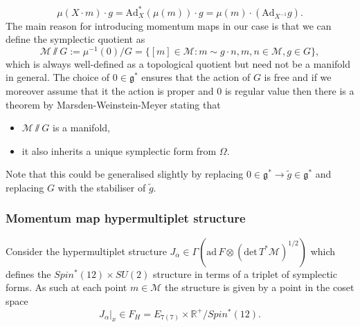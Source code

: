 \begin{equation}
    \mu(X\cdot m)\cdot g = \text{Ad}_{X}^*(\mu(m))\cdot g = \mu(m)\cdot(\text{Ad}_{X^{-1}}g). 
\end{equation}
The main reason for introducing momentum maps in our case is that we can define the symplectic quotient as 
\begin{equation}
    \mathcal{M}\sslash G := \mu^{-1}(0)/G = \{[m]\in \mathcal{M} : m\sim g\cdot n, m,n\in \mathcal{M}, g\in G\},
\end{equation}
which is always well-defined as a topological quotient but need not be a manifold in general. The choice of $0\in\mathfrak{g}^*$ ensures that the action of $G$ is free and if we moreover assume that it the action is proper and $0$ is regular value then there is a theorem by Marsden-Weinstein-Meyer stating that 
\begin{itemize}
    \item $\mathcal{M}\sslash G$ is a manifold,
    \item it also inherits a unique symplectic form from $\Omega$. 
\end{itemize}
Note that this could be generalised slightly by replacing $0\in\mathfrak{g}^*\to \tilde{g}\in\mathfrak{g}^*$ and replacing $G$ with the stabiliser of $\tilde{g}$.  

\subsubsection{Momentum map hypermultiplet structure}
Consider the hypermultiplet structure $J_\alpha\in\Gamma(\text{ad}\, F\otimes (\text{det}\, T^*\mathcal{M})^{1/2})$ which defines the $Spin^*(12)\times SU(2)$ structure in terms of a triplet of symplectic forms. As such at each point $m\in\mathcal{M}$ the structure is given by a point in the coset space
\begin{equation}
    J_\alpha|_x \in F_H = E_{7(7)}\times\mathbb{R}^+/Spin^*(12).
\end{equation}

